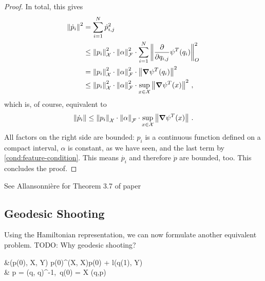 \begin{proof}
	In total, this gives
	\begin{align}
		\norm{\dot{p}_i}^2 &= \sum_{i=1}^N \dot{p}_{i,j}^2\\
		&\leq \norm{p_i}_{\mathcal{X}}^2 \cdot \norm{\alpha }_{\mathcal{F}}^2 \cdot \sum_{i=1}^N  \norm{\frac{\partial}{\partial q_{i, j}} \psi^T(q_i)}_O^2\\
		& = \norm{p_i}_{\mathcal{X}}^2 \cdot \norm{\alpha }_{\mathcal{F}}^2 \cdot \norm{\grad \psi^T(q_i)}^2 \\
		& \leq \norm{p_i}_{\mathcal{X}}^2 \cdot \norm{\alpha }_{\mathcal{F}}^2 \cdot \sup_{x \in \mathcal{X}}\norm{\grad \psi^T(x)}^2 \ ,
	\end{align}
	which is, of course, equivalent to 
	\begin{equation}
	\label{eq:norm-p-inequality}
		\norm{\dot{p}_i}\leq \norm{p_i}_{\mathcal{X}} \cdot \norm{\alpha }_{\mathcal{F}} \cdot \sup_{x \in \mathcal{X}}\norm{\grad \psi^T(x)} \ .
	\end{equation}
	All factors on the right side are bounded: $p_i$ is a continuous function defined on a compact interval, $\alpha$ is constant, as we have seen, and the last term by \cref{cond:feature-condition}.
	This means $\dot{p_i}$ and therefore $\dot{p}$ are bounded, too.
	This concludes the proof.
\end{proof}

See Allansonnière for Theorem 3.7 of paper

\subsection{Geodesic Shooting}

Using the Hamiltonian representation, we can now formulate another equivalent problem.
TODO: Why geodesic shooting?

\begin{problem}
	\label{prob:geodesic-shooting}
	\begin{cases}
		 &(p(0), X, Y) \coloneqq  {} p(0)^\T \bGamma(X, X)p(0) + l(q(1), Y)\\
		 & p = \bGamma(q, q)^{-1},\ q(0) = X  (q,p) 
	\end{cases}
\end{problem}

